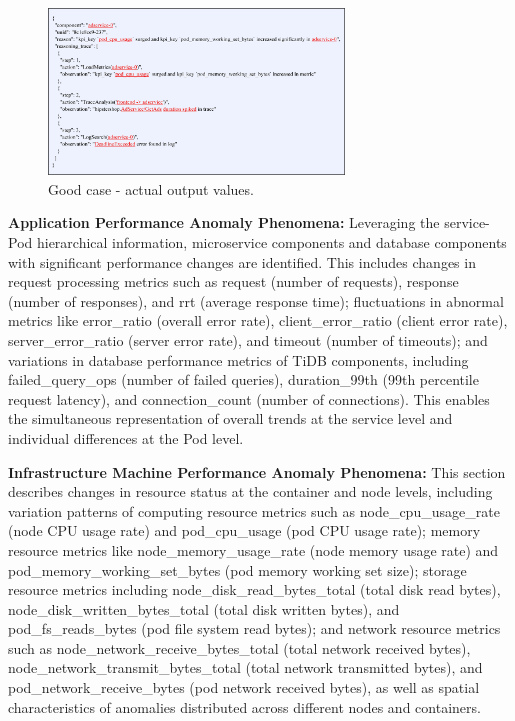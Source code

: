 \documentclass[10pt]{article}
\begin{document}
\begin{figure}[!t]
    \centering
    \includegraphics[width=0.7\textwidth]{fig20.png}
    \caption{Good case - actual output values.}
    \label{fig20}
\end{figure}

\textbf{Application Performance Anomaly Phenomena:} Leveraging the service-Pod hierarchical information, microservice components and database components with significant performance changes are identified. This includes changes in request processing metrics such as request (number of requests), response (number of responses), and rrt (average response time); fluctuations in abnormal metrics like error\_ratio (overall error rate), client\_error\_ratio (client error rate), server\_error\_ratio (server error rate), and timeout (number of timeouts); and variations in database performance metrics of TiDB components, including failed\_query\_ops (number of failed queries), duration\_99th (99th percentile request latency), and connection\_count (number of connections). This enables the simultaneous representation of overall trends at the service level and individual differences at the Pod level.

\textbf{Infrastructure Machine Performance Anomaly Phenomena:} This section describes changes in resource status at the container and node levels, including variation patterns of computing resource metrics such as node\_cpu\_usage\_rate (node CPU usage rate) and pod\_cpu\_usage (pod CPU usage rate); memory resource metrics like node\_memory\_usage\_rate (node memory usage rate) and pod\_memory\_working\_set\_bytes (pod memory working set size); storage resource metrics including node\_disk\_read\_bytes\_total (total disk read bytes), node\_disk\_written\_bytes\_total (total disk written bytes), and pod\_fs\_reads\_bytes (pod file system read bytes); and network resource metrics such as node\_network\_receive\_bytes\_total (total network received bytes), node\_network\_transmit\_bytes\_total (total network transmitted bytes), and pod\_network\_receive\_bytes (pod network received bytes), as well as spatial characteristics of anomalies distributed across different nodes and containers.
\end{document}
